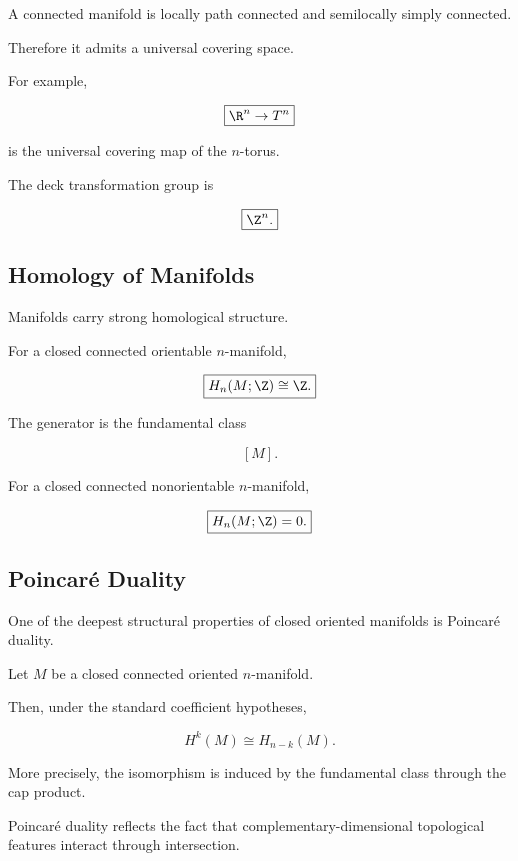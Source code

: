 A connected manifold is locally path connected and semilocally simply
connected.

Therefore it admits a universal covering space.

For example,

\[
\boxed{
\R^n\to T^n
}
\]

is the universal covering map of the \(n\)-torus.

The deck transformation group is

\[
\boxed{
\Z^n.
}
\]

\subsection{Homology of Manifolds}
\label{subsec:homology-manifolds}

Manifolds carry strong homological structure.

For a closed connected orientable \(n\)-manifold,

\[
\boxed{
H_n(M;\Z)\cong\Z.
}
\]

The generator is the fundamental class

\[
\boxed{
[M].
}
\]

For a closed connected nonorientable \(n\)-manifold,

\[
\boxed{
H_n(M;\Z)=0.
}
\]

\subsection{Poincar\'e Duality}
\label{subsec:poincare-duality-manifolds}

One of the deepest structural properties of closed oriented manifolds is
Poincar\'e duality.

\begin{theorem}
Let \(M\) be a closed connected oriented \(n\)-manifold.

Then, under the standard coefficient hypotheses,

\[
\boxed{
H^k(M)
\cong
H_{n-k}(M).
}
\]
\end{theorem}

More precisely, the isomorphism is induced by the fundamental class through
the cap product.

Poincar\'e duality reflects the fact that complementary-dimensional
topological features interact through intersection.

